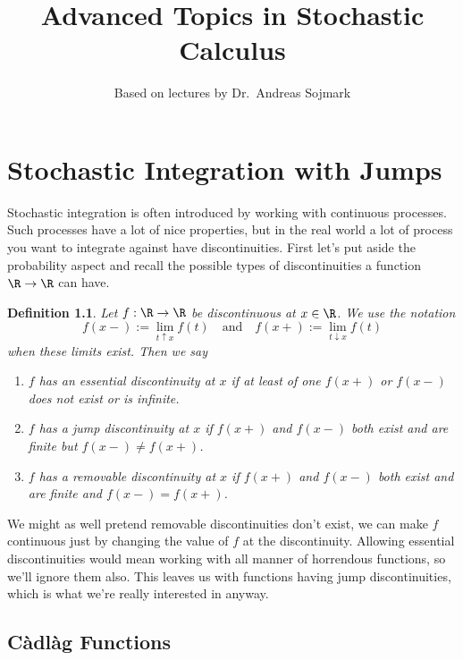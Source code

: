 \documentclass{scrreprt}
\title{Advanced Topics in Stochastic Calculus}
\author{Based on lectures by Dr.\ Andreas Sojmark}
\theoremstyle{mydefn}
\newtheorem{defn}{Definition}
\theoremstyle{remark}
\newcommand\defeq{:=}
\begin{document}
\maketitle

\clearpage\mbox{}\clearpage

\tableofcontents

\chapter{Stochastic Integration with Jumps}

Stochastic integration is often introduced by working with continuous processes. Such processes have a lot of nice properties, but in the real world a lot of process you want to integrate against have discontinuities. First let's put aside the probability aspect and recall the possible types of discontinuities a function $\R \to \R$ can have.

\begin{defn}
	Let $f: \R \to \R$ be discontinuous at $x \in \R$. We use the notation
	\begin{equation}
		f(x-) \defeq \lim_{t \uparrow x} f(t) \quad \text{and} \quad
		f(x+) \defeq \lim_{t \downarrow x} f(t)
	\end{equation}
	when these limits exist. Then we say
	\begin{enumerate}
		\item $f$ has an \emph{essential discontinuity} at $x$ if at least of one $f(x+)$ or $f(x-)$ does not exist or is infinite.
		\item $f$ has a \emph{jump discontinuity} at $x$ if $f(x+)$ and $f(x-)$ both exist and are finite but $f(x-) \neq f(x+)$.
		\item $f$ has a \emph{removable discontinuity} at $x$ if $f(x+)$ and $f(x-)$ both exist and are finite and $f(x-) = f(x+)$.
	\end{enumerate}
\end{defn}

We might as well pretend removable discontinuities don't exist, we can make $f$ continuous just by changing the value of $f$ at the discontinuity. Allowing essential discontinuities would mean working with all manner of horrendous functions, so we'll ignore them also. This leaves us with functions having jump discontinuities, which is what we're really interested in anyway.

\section{C\`adl\`ag Functions}
\end{document}
